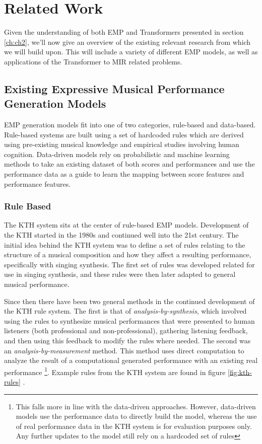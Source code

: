 \chapter{Related Work}\label{ch:ch3}
Given the understanding of both EMP and Transformers presented in section \ref{ch:ch2}, we'll now give an overview of the existing relevant research from which we will build upon. This will include a variety of different EMP models, as well as applications of the Transformer to MIR related problems. 

\section{Existing Expressive Musical Performance Generation Models}
EMP generation models fit into one of two categories, rule-based and data-based. Rule-based systems are built using a set of hardcoded rules which are derived using pre-existing musical knowledge and empirical studies involving human cognition. Data-driven models rely on probabilistic and machine learning methods to take an existing dataset of both scores and performances and use the performance data as a guide to learn the mapping between score features and performance features. 

\subsection{Rule Based}
The KTH system \cite{friberg2006overview} sits at the center of rule-based EMP models. Development of the KTH started in the 1980s and continued well into the 21st century. The initial idea behind the KTH system was to define a set of rules relating to the structure of a musical composition and how they affect a resulting performance, specifically with singing synthesis. The first set of rules was developed related for use in singing synthesis, and these rules were then later adapted to general musical performance. 

Since then there have been two general methods in the continued development of the KTH rule system. The first is that of \emph{analysis-by-synthesis}, which involved using the rules to synthesize musical performances that were presented to human listeners (both professional and non-professional), gathering listening feedback, and then using this feedback to modify the rules where needed. The second was an \emph{analysis-by-measurement} method. This method uses direct computation to analyze the result of a computational generated performance with an existing real performance \footnote{This falls more in line with the data-driven approaches. However, data-driven models use the performance data to directly build the model, whereas the use of real performance data in the KTH system is for evaluation purposes only. Any further updates to the model still rely on a hardcoded set of rules}. Example rules from the KTH system are found in figure \ref{fig:kth-rules} . 

